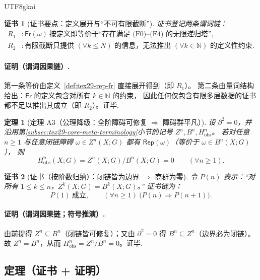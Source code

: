 \documentclass[12pt]{article}
\newtheorem{theorem}{定理}[section]
\newtheorem{Certificate}{证书}[section]
\newcommand{\NN}{\mathbb{N}}
\begin{document}
\begin{CJK*}{UTF8}{gkai}
\begin{Certificate}[证书要点：定义展开与“不可有限截断”]
证书登记两条谓词链：
\[
\begin{aligned}
  R_1 &: \mathsf{Fr}(\omega)\ \text{按定义即等价于“存在满足 (F0)--(F4) 的无限递归塔”},\\
  R_2 &: \text{有限截断只提供 }(\forall k\le N)\text{ 的信息，无法推出 }(\forall k\in\NN)\text{ 的定义性约束}.
\end{aligned}
\]
\end{Certificate}

\paragraph{证明（谓词因果链）.}
第一条等价由定义~\ref{def:tex29-rep-fr} 直接展开得到（即 $R_1$）。
第二条由量词结构给出：$\mathsf{Fr}$ 的定义包含对所有 $k\in\NN$ 的约束，
因此任何仅包含有限多层数据的证书都不足以推出其成立（即 $R_2$）。证毕.

\begin{theorem}[定理 A3（公理降级：全阶障碍可修复 $\Rightarrow$ 障碍群平凡）]
\label{thm:tex29-formal-all-degree-trivial}
设 $\partial^2=0$，并沿用第\ref{subsec:tex29-core-meta-terminology}小节的记号 $Z^n,B^n,H^n_{\mathrm{obs}}$。
若对任意 $n\ge 1$ 与任意闭链障碍 $\omega\in Z^n(X;G)$ 都有 $\mathsf{Rep}(\omega)$（等价于 $\omega\in B^n(X;G)$），
则
\[
  H^n_{\mathrm{obs}}(X;G)=Z^n(X;G)/B^n(X;G)=0\qquad(\forall n\ge 1).
\]
\end{theorem}

\begin{Certificate}[证书（按阶数归纳）：闭链皆为边界 $\Rightarrow$ 商群为零]
令 $P(n)$ 表示：“对所有 $1\le k\le n$，$Z^k(X;G)=B^k(X;G)$。”
证书链为：
\[
  P(1)\ \text{成立},\qquad (\forall n\ge 1)\ \bigl(P(n)\Rightarrow P(n+1)\bigr).
\]
\end{Certificate}

\paragraph{证明（谓词因果链；符号推演）.}
由前提得 $Z^{n}\subseteq B^{n}$（闭链皆可修复）；又由 $\partial^2=0$ 得 $B^{n}\subseteq Z^{n}$（边界必为闭链）。
故 $Z^{n}=B^{n}$，从而 $H^n_{\mathrm{obs}}=Z^n/B^n=0$。证毕.

\subsection{定理（证书 + 证明）}
\label{subsec:tex29-formal-theorems}


\end{CJK*}
\end{document}
